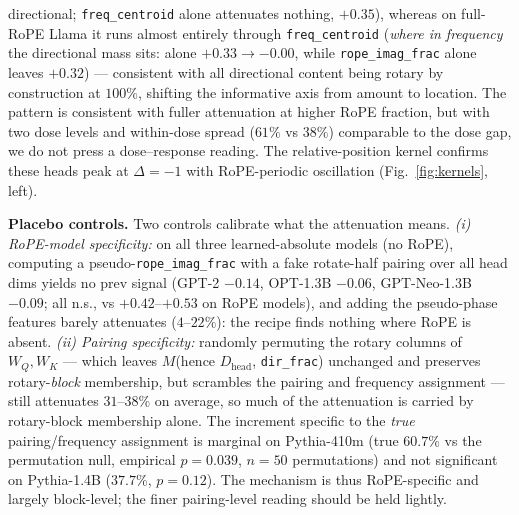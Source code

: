 \documentclass[11pt]{article}
\newcommand{\dirfrac}{\texttt{dir\_frac}\xspace}
\newcommand{\Dhead}{\ensuremath{D_{\text{head}}}\xspace}
\newcommand{\ropeimag}{\texttt{rope\_imag\_frac}\xspace}
\newcommand{\M}{\ensuremath{M}\xspace}
\newcommand{\Rope}{RoPE\xspace}
\begin{document}
directional; \texttt{freq\_centroid} alone attenuates nothing, $+0.35$), whereas on full-\Rope Llama it runs almost
entirely through \texttt{freq\_centroid} (\emph{where in frequency} the directional mass sits: alone
$+0.33\to-0.00$, while \ropeimag alone leaves $+0.32$) --- consistent with all directional content being rotary by
construction at $100\%$, shifting the informative axis from amount to location. The pattern is consistent with
fuller attenuation at higher \Rope fraction, but with two dose levels and within-dose spread ($61\%$ vs $38\%$)
comparable to the dose gap, we do not press a dose--response reading. The relative-position kernel confirms these
heads peak at $\Delta{=}{-}1$ with \Rope-periodic oscillation (Fig.~\ref{fig:kernels}, left).

\textbf{Placebo controls.} Two controls calibrate what the attenuation means. \emph{(i) \Rope-model specificity:} on
all three learned-absolute models (no \Rope), computing a pseudo-\ropeimag with a fake rotate-half pairing over all
head dims yields no prev signal (GPT-2 $-0.14$, OPT-1.3B $-0.06$, GPT-Neo-1.3B $-0.09$; all n.s., vs
$+0.42$--$+0.53$ on \Rope models), and adding the pseudo-phase features barely attenuates ($4$--$22\%$): the recipe
finds nothing where \Rope is absent. \emph{(ii) Pairing
specificity:} randomly permuting the rotary columns of $W_Q,W_K$ --- which leaves \M (hence \Dhead, \dirfrac)
unchanged and preserves rotary-\emph{block} membership, but scrambles the pairing and frequency assignment --- still
attenuates $31$--$38\%$ on average, so much of the attenuation is carried by rotary-block membership alone. The
increment specific to the \emph{true} pairing/frequency assignment is marginal on Pythia-410m (true $60.7\%$ vs the
permutation null, empirical $p{=}0.039$, $n{=}50$ permutations) and not significant on Pythia-1.4B ($37.7\%$,
$p{=}0.12$). The mechanism is thus \Rope-specific and largely block-level; the finer pairing-level reading should be
held lightly.
\end{document}
